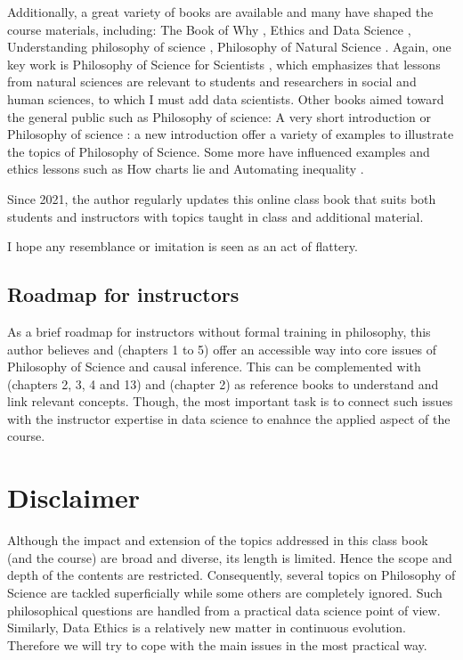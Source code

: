 \documentclass[
  12pt,
]{book}
\begin{document}
Additionally, a great variety of books are available and many have shaped the course materials, including: The Book of Why \citep{book-of-why}, Ethics and Data Science \citep{loukides2018ethics}, Understanding philosophy of science \citep{ladyman2012understanding}, Philosophy of Natural Science \citep{hempel-pos}. Again, one key work is Philosophy of Science for Scientists \citep{johansson2016philosophy}, which emphasizes that lessons from natural sciences are relevant to students and researchers in social and human sciences, to which I must add data scientists. Other books aimed toward the general public such as Philosophy of science: A very short introduction \citep{okasha-pos} or Philosophy of science : a new introduction \citep{barker-pos} offer a variety of examples to illustrate the topics of Philosophy of Science. Some more have influenced examples and ethics lessons such as How charts lie \citep{cairo2019charts} and Automating inequality \citep{eubanks2018automating}.

Since 2021, the author regularly updates this online class book that suits both students and instructors with topics taught in class and additional material.

I hope any resemblance or imitation is seen as an act of flattery.

\subsection*{Roadmap for instructors}\label{roadmap-for-instructors}

As a brief roadmap for instructors without formal training in philosophy, this author believes \citep{okasha-pos} and \citep{book-of-why} (chapters 1 to 5) offer an accessible way into core issues of Philosophy of Science and causal inference. This can be complemented with \citep{johansson2016philosophy} (chapters 2, 3, 4 and 13) and \citep{ladyman2012understanding} (chapter 2) as reference books to understand and link relevant concepts. Though, the most important task is to connect such issues with the instructor expertise in data science to enahnce the applied aspect of the course.

\section*{Disclaimer}\label{disclaimer}

Although the impact and extension of the topics addressed in this class book (and the course) are broad and diverse, its length is limited. Hence the scope and depth of the contents are restricted. Consequently, several topics on Philosophy of Science are tackled superficially while some others are completely ignored. Such philosophical questions are handled from a practical data science point of view. Similarly, Data Ethics is a relatively new matter in continuous evolution. Therefore we will try to cope with the main issues in the most practical way.
\end{document}
